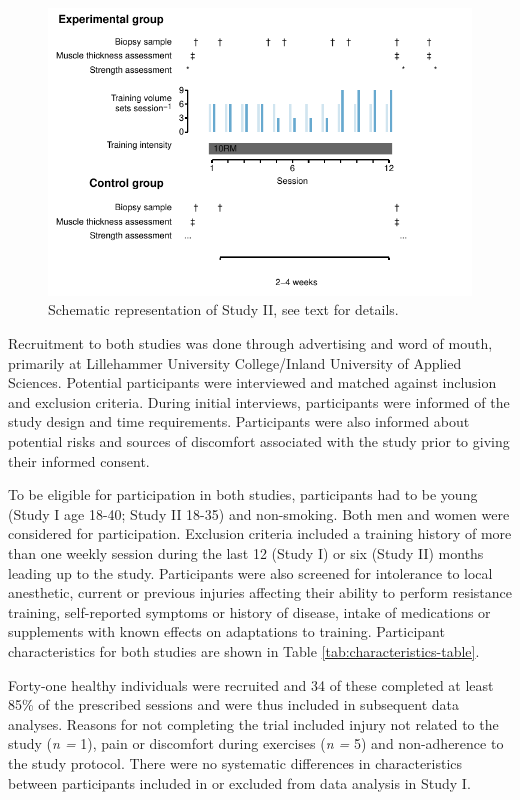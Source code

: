 \documentclass[twoside,10pt]{gihclass} %
\begin{document}
\begin{figure}

{\centering \includegraphics{thesis_files/figure-latex/study2-overview-1} 

}

\caption[Study II, schematic overview]{Schematic representation of Study II, see text for details.  }\label{fig:study2-overview}
\end{figure}
Recruitment to both studies was done through advertising and word of mouth, primarily at Lillehammer University College/Inland University of Applied Sciences. Potential participants were interviewed and matched against inclusion and exclusion criteria. During initial interviews, participants were informed of the study design and time requirements. Participants were also informed about potential risks and sources of discomfort associated with the study prior to giving their informed consent.

To be eligible for participation in both studies, participants had to be young (Study I age 18-40; Study II 18-35) and non-smoking. Both men and women were considered for participation. Exclusion criteria included a training history of more than one weekly session during the last 12 (Study I) or six (Study II) months leading up to the study. Participants were also screened for intolerance to local anesthetic, current or previous injuries affecting their ability to perform resistance training, self-reported symptoms or history of disease, intake of medications or supplements with known effects on adaptations to training.
Participant characteristics for both studies are shown in Table
\ref{tab:characteristics-table}.

Forty-one healthy individuals were recruited and 34 of these completed at least 85\% of the prescribed sessions and were thus included in subsequent data analyses. Reasons for not completing the trial included injury not related to the study (\emph{n =} 1), pain or discomfort during exercises (\emph{n =} 5) and non-adherence to the study protocol. There were no systematic differences in characteristics between participants included in or excluded from data analysis in Study I.
\end{document}
